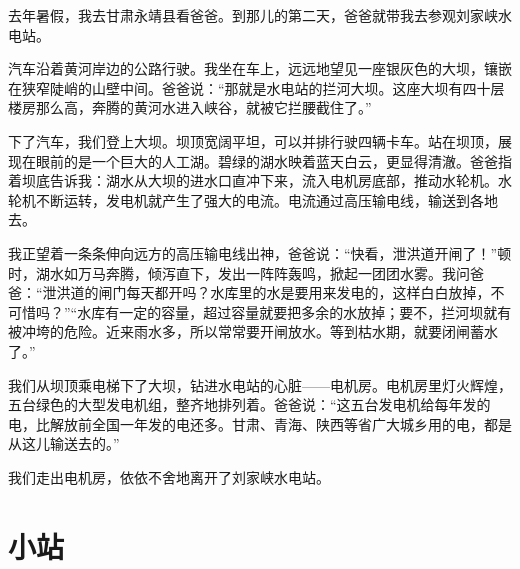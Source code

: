 \documentclass[12pt,UTF-8,openany]{ctexbook}
\begin{document}
\begin{large}
    
    去年暑假，我去甘肃永靖县看爸爸。到那儿的第二天，爸爸就带我去参观刘家峡水电站。
    
    汽车沿着黄河岸边的公路行驶。我坐在车上，远远地望见一座银灰色的大坝，镶嵌在狭窄陡峭的山壁中间。爸爸说：“那就是水电站的拦河大坝。这座大坝有四十层楼房那么高，奔腾的黄河水进入峡谷，就被它拦腰截住了。”
    
    下了汽车，我们登上大坝。坝顶宽阔平坦，可以并排行驶四辆卡车。站在坝顶，展现在眼前的是一个巨大的人工湖。碧绿的湖水映着蓝天白云，更显得清澈。爸爸指着坝底告诉我：湖水从大坝的进水口直冲下来，流入电机房底部，推动水轮机。水轮机不断运转，发电机就产生了强大的电流。电流通过高压输电线，输送到各地去。
    
    我正望着一条条伸向远方的高压输电线出神，爸爸说：“快看，泄洪道开闸了！”顿时，湖水如万马奔腾，倾泻直下，发出一阵阵轰鸣，掀起一团团水雾。我问爸爸：“泄洪道的闸门每天都开吗？水库里的水是要用来发电的，这样白白放掉，不可惜吗？”“水库有一定的容量，超过容量就要把多余的水放掉；要不，拦河坝就有被冲垮的危险。近来雨水多，所以常常要开闸放水。等到枯水期，就要闭闸蓄水了。”
    
    我们从坝顶乘电梯下了大坝，钻进水电站的心脏——电机房。电机房里灯火辉煌，五台绿色的大型发电机组，整齐地排列着。爸爸说：“这五台发电机给每年发的电，比解放前全国一年发的电还多。甘肃、青海、陕西等省广大城乡用的电，都是从这儿输送去的。”
    
    我们走出电机房，依依不舍地离开了刘家峡水电站。
    
\end{large}



\chapter{小站}
\end{document}
